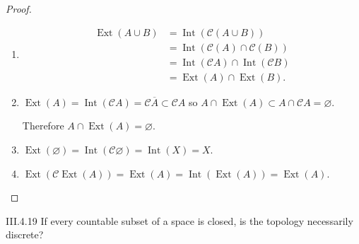 \begin{proof}
    \begin{enumerate}[label={(\alph*)},leftmargin=*,itemsep=0pt]
        \item \begingroup
              \allowdisplaybreaks%
              \begin{align*}
                  \operatorname{Ext}(A \cup B) & = \operatorname{Int}(\mathscr{C}(A \cup B))                              \\
                                               & = \operatorname{Int}(\mathscr{C}(A) \cap \mathscr{C}(B))                 \\
                                               & = \operatorname{Int}(\mathscr{C}A) \cap \operatorname{Int}(\mathscr{C}B) \\
                                               & = \operatorname{Ext}(A) \cap \operatorname{Ext}(B).
              \end{align*}
              \endgroup
        \item \( \operatorname{Ext}(A) = \operatorname{Int}(\mathscr{C}A) = \mathscr{C}\overline{A} \subset \mathscr{C}A \) so \( A \cap \operatorname{Ext}(A) \subset A \cap \mathscr{C}A = \varnothing \).

              Therefore \( A \cap \operatorname{Ext}(A) = \varnothing \).
        \item \( \operatorname{Ext}(\varnothing) = \operatorname{Int}(\mathscr{C}\varnothing) = \operatorname{Int}(X) = X \).
        \item \( \operatorname{Ext}(\mathscr{C}\operatorname{Ext}(A)) = \operatorname{Ext}(A) = \operatorname{Int}(\operatorname{Ext}(A)) = \operatorname{Ext}(A) \).
    \end{enumerate}
\end{proof}

\begin{problem}{III.4.19}
If every countable subset of a space is closed, is the topology necessarily discrete?
\end{problem}

